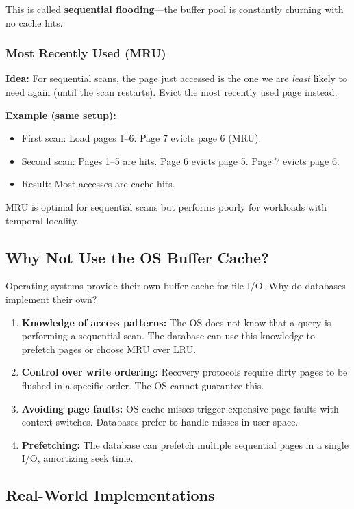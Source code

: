This is called \textbf{sequential flooding}---the buffer pool is constantly churning with no cache hits.

\subsubsection*{Most Recently Used (MRU)}

\textbf{Idea:} For sequential scans, the page just accessed is the one we are \textit{least} likely to need again (until the scan restarts). Evict the most recently used page instead.

\textbf{Example (same setup):}
\begin{itemize}
    \item First scan: Load pages 1--6. Page 7 evicts page 6 (MRU).
    \item Second scan: Pages 1--5 are hits. Page 6 evicts page 5. Page 7 evicts page 6.
    \item Result: Most accesses are cache hits.
\end{itemize}

MRU is optimal for sequential scans but performs poorly for workloads with temporal locality.

\subsection{Why Not Use the OS Buffer Cache?}

Operating systems provide their own buffer cache for file I/O. Why do databases implement their own?

\begin{enumerate}
    \item \textbf{Knowledge of access patterns:} The OS does not know that a query is performing a sequential scan. The database can use this knowledge to prefetch pages or choose MRU over LRU.
    \item \textbf{Control over write ordering:} Recovery protocols require dirty pages to be flushed in a specific order. The OS cannot guarantee this.
    \item \textbf{Avoiding page faults:} OS cache misses trigger expensive page faults with context switches. Databases prefer to handle misses in user space.
    \item \textbf{Prefetching:} The database can prefetch multiple sequential pages in a single I/O, amortizing seek time.
\end{enumerate}

\subsection{Real-World Implementations}

